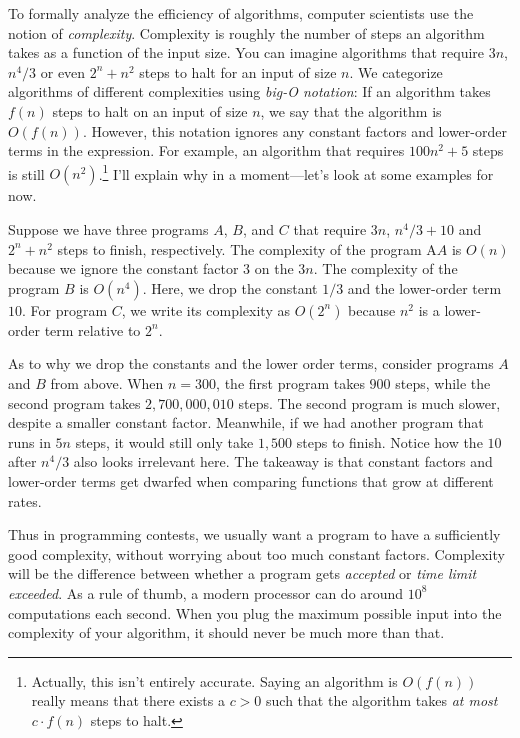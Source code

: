 To formally analyze the efficiency of algorithms, computer scientists use the notion of \emph{complexity}. Complexity is roughly the number of steps an algorithm takes as a function of the input size. You can imagine algorithms that require $3n$, $n^4/3$ or even $2^n + n^2$ steps to halt for an input of size $n$. We categorize algorithms of different complexities using \emph{big-O notation}: If an algorithm takes $f(n)$ steps to halt on an input of size $n$, we say that the algorithm is $O(f(n))$. However, this notation ignores any constant factors and lower-order terms in the expression. For example, an algorithm that requires $100n^2 + 5$ steps is still $O(n^2)$.\footnote{Actually, this isn't entirely accurate. Saying an algorithm is $O(f(n))$ really means that there exists a $c > 0$ such that the algorithm takes \emph{at most} $c\cdot f(n)$ steps to halt.} I'll explain why in a moment---let's look at some examples for now. 

Suppose we have three programs $A$, $B$, and $C$ that require $3n$, $n^4/3+10$ and $2^n + n^2$ steps to finish, respectively. The complexity of the program A$A$ is $O(n)$ because we ignore the constant factor $3$ on the $3n$. The complexity of the program $B$ is $O(n^4)$. Here, we drop the constant $1/3$ and the lower-order term $10$. For program $C$, we write its complexity as $O(2^n)$ because $n^2$ is a lower-order term relative to $2^n$.

As to why we drop the constants and the lower order terms, consider programs $A$ and $B$ from above. When $n=300$, the first program takes $900$ steps, while the second program takes $2,700,000,010$ steps. The second program is much slower, despite a smaller constant factor. Meanwhile, if we had another program that runs in $5n$ steps, it would still only take $1,500$ steps to finish. Notice how the $10$ after $n^4/3$ also looks irrelevant here. The takeaway is that constant factors and lower-order terms get dwarfed when comparing functions that grow at different rates. 

Thus in programming contests, we usually want a program to have a sufficiently good complexity, without worrying about too much constant factors. Complexity will be the difference between whether a program gets \emph{\color{green}accepted} or \emph{\color{red}time limit exceeded}. As a rule of thumb, a modern processor can do around $10^8$ computations each second. When you plug the maximum possible input into the complexity of your algorithm, it should never be much more than that.

